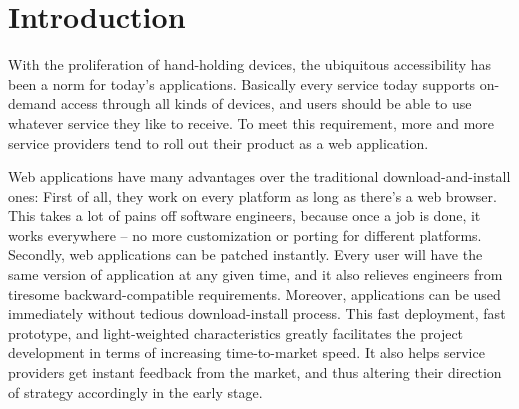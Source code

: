 \documentclass[conference]{IEEEtran}
\begin{document}
%
%
%
\section{Introduction}
With the proliferation of hand-holding devices,
the ubiquitous accessibility has been a norm for today's applications.
Basically every service today supports on-demand access through all kinds of devices,
and users should be able to use whatever service they like to receive.
To meet this requirement, more and more service providers tend to roll
out their product as a
web application.

Web applications have many advantages over the traditional download-and-install ones:
First of all, they work on every platform as long as there's a web browser.
This takes a lot of pains off software engineers, because once a job is done, it works everywhere
-- no more customization or porting for different platforms.
Secondly, web applications can be patched instantly.
Every user will have the same version of application at any given time,
and it also relieves engineers from
tiresome backward-compatible requirements.
Moreover,
applications can be used immediately without tedious download-install process.
This fast deployment, fast prototype, and light-weighted characteristics
greatly facilitates the project development in terms of
increasing time-to-market speed.
It also helps service providers get instant
feedback from the market, and thus altering their direction of strategy accordingly in the early stage.
\end{document}
